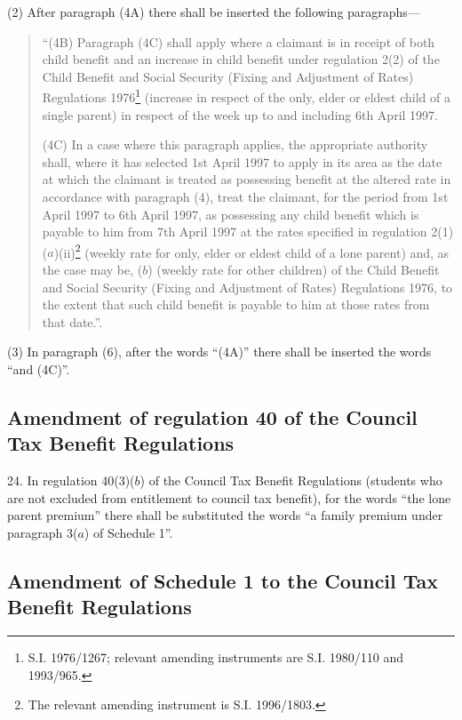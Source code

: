 \documentclass[12pt,a4paper]{article}
\begin{document}
(2) After paragraph (4A) there shall be inserted the following paragraphs—
\begin{quotation}
“(4B) Paragraph (4C) shall apply where a claimant is in receipt of both child benefit and an increase in child benefit under regulation 2(2) of the Child Benefit and Social Security (Fixing and Adjustment of Rates) Regulations 1976\footnote{\frenchspacing S.I. 1976/1267; relevant amending instruments are S.I. 1980/110 and 1993/965.} (increase in respect of the only, elder or eldest child of a single parent) in respect of the week up to and including 6th April 1997.

(4C) In a case where this paragraph applies, the appropriate authority shall, where it has selected 1st April 1997 to apply in its area as the date at which the claimant is treated as possessing benefit at the altered rate in accordance with paragraph (4), treat the claimant, for the period from 1st April 1997 to 6th April 1997, as possessing any child benefit which is payable to him from 7th April 1997 at the rates specified in regulation 2(1)($a$)(ii)\footnote{\frenchspacing The relevant amending instrument is S.I. 1996/1803.} (weekly rate for only, elder or eldest child of a lone parent) and, as the case may be, ($b$) (weekly rate for other children) of the Child Benefit and Social Security (Fixing and Adjustment of Rates) Regulations 1976, to the extent that such child benefit is payable to him at those rates from that date.”.
\end{quotation}

(3) In paragraph (6), after the words “(4A)” there shall be inserted the words “and (4C)”.

\subsection[24. Amendment of regulation 40 of the Council Tax Benefit Regulations]{Amendment of regulation 40 of the Council Tax Benefit Regulations}

24.  In regulation 40(3)($b$) of the Council Tax Benefit Regulations (students who are not excluded from entitlement to council tax benefit), for the words “the lone parent premium” there shall be substituted the words “a family premium under paragraph 3($a$) of Schedule 1”.

\subsection[25. Amendment of Schedule 1 to the Council Tax Benefit Regulations]{Amendment of Schedule 1 to the Council Tax Benefit Regulations}
\end{document}
